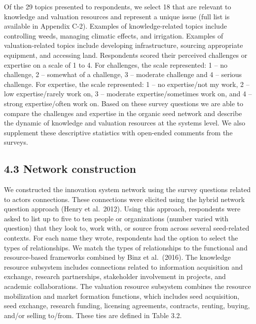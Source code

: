 \documentclass[twoside,12pt,final]{ucthesis-CA2012}
\begin{document}
\begin{ucmainmatter}
Of the 29 topics presented to respondents, we select 18 that are
relevant to knowledge and valuation resources and represent a unique
issue (full list is available in Appendix C-2). Examples of
knowledge-related topics include controlling weeds, managing climatic
effects, and irrigation. Examples of valuation-related topics include
developing infrastructure, sourcing appropriate equipment, and accessing
land. Respondents scored their perceived challenges or expertise on a
scale of 1 to 4. For challenges, the scale represented: 1 -- no
challenge, 2 -- somewhat of a challenge, 3 -- moderate challenge and 4
-- serious challenge. For expertise, the scale represented: 1 -- no
expertise/not my work, 2 -- low expertise/rarely work on, 3 -- moderate
expertise/sometimes work on, and 4 -- strong expertise/often work on.
Based on these survey questions we are able to compare the challenges
and expertise in the organic seed network and describe the dynamic of
knowledge and valuation resources at the systems level. We also
supplement these descriptive statistics with open-ended comments from
the surveys.

\hypertarget{network-construction-1}{%
\subsection{4.3 Network construction}\label{network-construction-1}}

We constructed the innovation system network using the survey questions
related to actors\textquotesingle{} connections. These connections were elicited using
the \textquotesingle hybrid\textquotesingle{} network question approach (Henry et al.~2012). Using this
approach, respondents were asked to list up to five to ten people or
organizations (number varied with question) that they look to, work
with, or source from across several seed-related contexts. For each name
they wrote, respondents had the option to select the types of
relationships. We match the types of relationships to the functional and
resource-based frameworks combined by Binz et al.~(2016). The knowledge
resource subsystem includes connections related to information
acquisition and exchange, research partnerships, stakeholder involvement
in projects, and academic collaborations. The valuation resource
subsystem combines the resource mobilization and market formation
functions, which includes seed acquisition, seed exchange, research
funding, licensing agreements, contracts, renting, buying, and/or
selling to/from. These ties are defined in Table 3.2.
\begin{table}


\end{table}
\end{ucmainmatter}
\end{document}
